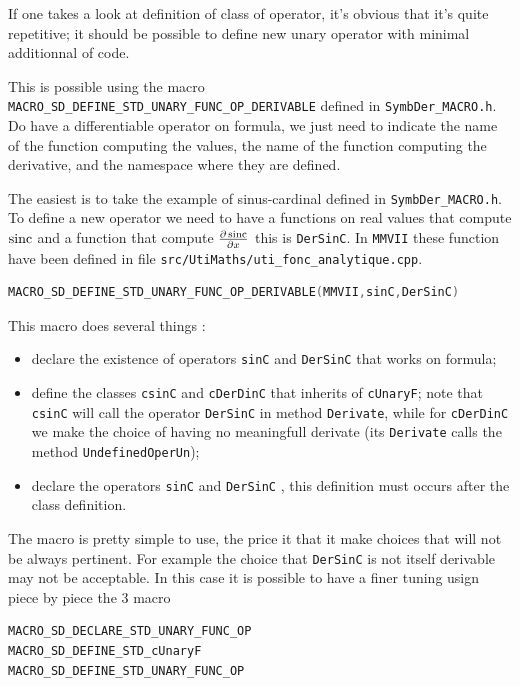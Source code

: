 If one takes a look at definition of class of operator, it's obvious that it's quite repetitive;
it should be possible to define new unary operator with minimal additionnal of code.

This is possible using the macro {\tt MACRO\_SD\_DEFINE\_STD\_UNARY\_FUNC\_OP\_DERIVABLE}
defined in {\tt SymbDer\_MACRO.h}.
Do have a differentiable operator on formula, we just need to indicate the name
of the function computing the values, the name of the function computing the derivative,
and the namespace where they are defined.

The easiest is to take the example of sinus-cardinal defined in  {\tt SymbDer\_MACRO.h}.
To define a new operator we need to have a functions on real values that compute $\operatorname{sinc}$ and a function
that compute $\frac{\partial \operatorname{sinc}}{\partial x}$  this is {\tt DerSinC}.  In {\tt MMVII} these function have been
defined in file  {\tt src/UtiMaths/uti\_fonc\_analytique.cpp}. 


\begin{lstlisting}[language=c++]
MACRO_SD_DEFINE_STD_UNARY_FUNC_OP_DERIVABLE(MMVII,sinC,DerSinC)
\end{lstlisting}

This macro does several things :

\begin{itemize}
	\item  declare the existence of operators {\tt sinC} and {\tt DerSinC} that works on formula;

	\item  define the classes  {\tt csinC} and {\tt cDerDinC} that inherits of {\tt cUnaryF};
		note that {\tt csinC}  will call the operator {\tt DerSinC} in method {\tt Derivate},
		while for {\tt cDerDinC}  we make the choice of having no meaningfull derivate
		(its {\tt Derivate} calls the method {\tt UndefinedOperUn});

	\item  declare the operators {\tt sinC} and {\tt DerSinC} , this definition must occurs  after the class
		definition.
\end{itemize}

The macro is pretty simple to use, the price it that it make choices that will not be always pertinent.
For example the choice that {\tt DerSinC} is not itself derivable may not be acceptable.
In this case it is possible to have a finer tuning usign piece by piece the $3$ macro

\begin{lstlisting}[language=c++]
MACRO_SD_DECLARE_STD_UNARY_FUNC_OP
MACRO_SD_DEFINE_STD_cUnaryF
MACRO_SD_DEFINE_STD_UNARY_FUNC_OP
\end{lstlisting}

